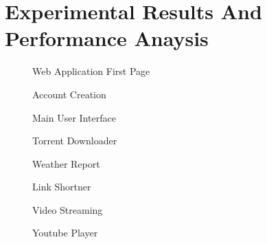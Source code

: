 \chapter{Experimental Results And Performance Anaysis}
\newpage



\begin{figure}[h]
\begin{center}
    \caption{Web Application First Page}
    \label{1}
\end{center}
\end{figure}
    
\begin{figure}[h]
\begin{center}
    \caption{Account Creation}
    \label{1}
\end{center}
\end{figure}
    
    
\begin{figure}[h]
\begin{center}
     \caption{Main User Interface}
    \label{1}
\end{center}
\end{figure}

\begin{figure}[h]
\begin{center}
    \caption{Torrent Downloader}
    \label{1}
\end{center}
\end{figure}


\begin{figure}[h]
\begin{center}
    \caption{Weather Report}
    \label{1}
\end{center}
\end{figure}


\begin{figure}[h]
\begin{center}
    \caption{Link Shortner}
    \label{1}
\end{center}
\end{figure}

\begin{figure}[h]
\begin{center}
    \caption{Video Streaming}
    \label{1}
\end{center}
\end{figure}

\begin{figure}[h]
\begin{center}
    \caption{Youtube Player}
    \label{1}
\end{center}
\end{figure}
